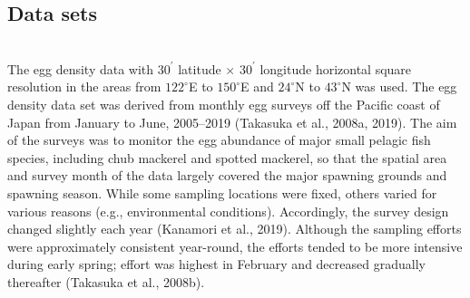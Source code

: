 \documentclass[12pt]{article}
\begin{document}
\begin{linenumbers}
{\subsection{Data sets}
\\
The egg density data with $\textrm{30}^\prime$ latitude $\times$ $\textrm{30}^\prime$ longitude horizontal square resolution in the areas from $\textrm{122}^\circ$E to $\textrm{150}^\circ$E and $\textrm{24}^\circ$N to $\textrm{43}^\circ$N was used. The egg density data set was derived from monthly egg surveys off the Pacific coast of Japan from January to June, 2005--2019 (Takasuka et al., 2008a, 2019). The aim of the surveys was to monitor the egg abundance of major small pelagic fish species, including chub mackerel and spotted mackerel, so that the spatial area and survey month of the data largely covered the major spawning grounds and spawning season. While some sampling locations were fixed, others varied for various reasons (e.g., environmental conditions). Accordingly, the survey design changed slightly each year (Kanamori et al., 2019). Although the sampling efforts were approximately consistent year-round, the efforts tended to be more intensive during early spring; effort was highest in February and decreased gradually thereafter (Takasuka et al., 2008b).

}
\end{linenumbers}
\end{document}
